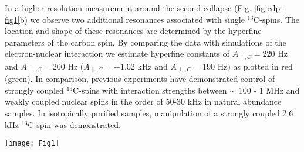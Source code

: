 In a higher resolution measurement around the second collapse (Fig. \ref{fig:cdp-fig1}b) we observe two additional resonances associated with single $^{13}$C-spins. The location and shape of these resonances are determined by the hyperfine parameters of the carbon spin\cite{Taminiau_Phys.Rev.Lett._2012}. By comparing the data with simulations of the electron-nuclear interaction we estimate hyperfine constants of $A_{\parallel,C} = 220$ Hz and $A_{\perp,C} = 200$ Hz ($A_{\parallel,C} = -1.02$ kHz and $A_{\perp,C} = 190$ Hz) as plotted in red (green). In comparison, previous experiments have demonstrated control of strongly coupled $^{13}$C-spins with interaction strengths between $\sim$ 100 - 1 MHz \cite{Jelezko_Phys.Rev.Lett._2004,Dutt_Science_2007,Pfaff_NatPhys_2013,Neumann_Science_2008} and weakly coupled nuclear spins in the order of 50-30 kHz \cite{Taminiau_NatNano_2014} in natural abundance samples. In isotopically purified samples, manipulation of a strongly coupled 2.6 kHz $^{13}$C-spin was demonstrated\cite{Maurer_Science_2012}.

 \begin{figure*}
	\centering
	\texttt{[image: Fig1]}
	\caption{\label{fig:cdp-fig1} \textbf{} (a) Dynamical Decoupling spectroscopy of the $^{13}$C-spin bath. Grey lines are the expected collapses of the signal due to interaction with the $^{13}$C-spin bath. They occur at $\tau_k = \frac{\pi(2k-1)}{2\omega_L}$, with $k = 1,2,3...$ the order of the resonance and $\omega_L$ the larmor frequency of the $^{13}$C spins.(b) Two $^{13}$C-spins can be identified, red (green) line is a simulation of the resulting signal for the interaction with a single spin with hyperfine constants of $A_{\parallel,C} = 220$ Hz and $A_{\perp,C} = 200$ Hz ($A_{\parallel,C} = -1.02$ kHz and $A_{\perp,C} = 190$ Hz), plotted in red: carbon 1 (green: carbon 2). (c) Free induction decay of carbon 1 with and without repetitive reset }
\end{figure*}

